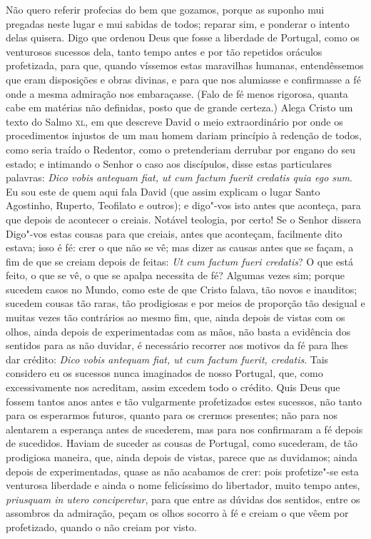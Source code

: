Não quero referir profecias do bem que gozamos, porque as suponho mui
pregadas neste lugar e mui sabidas de todos; reparar sim, e ponderar o
intento delas quisera. Digo que ordenou Deus que fosse a liberdade de
Portugal, como os venturosos sucessos dela, tanto tempo antes e por tão
repetidos oráculos profetizada, para que, quando víssemos estas
maravilhas humanas, entendêssemos que eram disposições e obras divinas,
e para que nos alumiasse e confirmasse a fé onde a mesma admiração nos
embaraçasse. (Falo de fé menos rigorosa, quanta cabe em matérias não
definidas, posto que de grande certeza.) Alega Cristo um texto do Salmo
\textsc{xl}, em que descreve David o meio extraordinário por onde os
procedimentos injustos de um mau homem dariam princípio à redenção de
todos, como seria traído o Redentor, como o pretenderiam derrubar por
engano do seu estado; e intimando o Senhor o caso aos discípulos, disse
estas particulares palavras: \emph{Dico vobis antequam fiat, ut cum
factum fuerit credatis quia ego sum}. Eu sou este de quem aqui fala David (que assim explicam o lugar Santo Agostinho, Ruperto, Teofilato e outros); e digo"-vos isto antes que aconteça, para que depois de acontecer o creiais.
Notável teologia, por certo! Se o Senhor dissera Digo"-vos estas cousas
para que creiais, antes que aconteçam, facilmente dito estava; isso é fé:
crer o que não se vê; mas dizer as causas antes que se façam, a fim
de que se creiam depois de feitas: \emph{Ut cum factum fueri credatis}?
O que está feito, o que se vê, o que se apalpa necessita de fé?
Algumas vezes sim; porque sucedem casos no Mundo, como este de que
Cristo falava, tão novos e inauditos; sucedem cousas tão raras, tão
prodigiosas e por meios de proporção tão desigual e muitas vezes tão
contrários ao mesmo fim, que, ainda depois de vistas com os olhos, ainda
depois de experimentadas com as mãos, não basta a evidência dos sentidos
para as não duvidar, é necessário recorrer aos motivos da fé para lhes
dar crédito: \emph{Dico vobis antequam fiat, ut cum factum fuerit,
credatis}. Tais considero eu os sucessos nunca imaginados de nosso
Portugal, que, como excessivamente nos acreditam, assim excedem todo o
crédito.
Quis Deus que fossem tantos anos antes e tão vulgarmente profetizados
estes sucessos, não tanto para os esperarmos futuros, quanto para os
crermos presentes; não para nos alentarem a esperança antes de
sucederem, mas para nos confirmaram a fé depois de sucedidos. Haviam de
suceder as cousas de Portugal, como sucederam, de tão prodigiosa
maneira, que, ainda depois de vistas, parece que as duvidamos; ainda
depois de experimentadas, quase as não acabamos de crer: pois
profetize"-se esta venturosa liberdade e ainda o nome felicíssimo do
libertador, muito tempo antes, \emph{priusquam in utero conciperetur},
para que entre as dúvidas dos sentidos, entre os assombros da
admiração, peçam os olhos socorro à fé e creiam o que vêem por
profetizado, quando o não creiam por visto.

